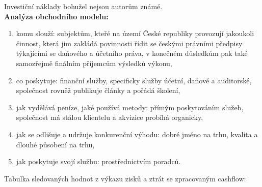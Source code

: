 Investiční náklady bohužel nejsou autorům známé.\\

\noindent\textbf{Analýza obchodního modelu:}

\begin{enumerate}
	\item komu slouží: subjektům, kteřé na území České republiky provozují jakoukoli činnost, která jim zakládá povinnosti řídit se českými právními předpisy týkajícími se daňového a účetního práva, v konečném důsledkům pak také samozřejmě finálním příjemcům výsledků výkonu,
	\item co poskytuje: finanční služby, specificky služby účetní, daňové a auditorské, společnost rovněž publikuje články a pořádá školení,
	\item jak vydělává peníze, jaké používá metody: přímým poskytováním služeb, společnost má stálou klientelu a akvizice probíhá organicky,
	\item jak se odlišuje a udržuje konkurenční výhodu: dobré jméno na trhu, kvalita a dlouhé působení na trhu,
	\item jak poskytuje svojí službu: prostřednictvím poradců.
\end{enumerate}

\newpage

Tabulka sledovaných hodnot z výkazu zisků a ztrát se zpracovaným cashflow:\\

